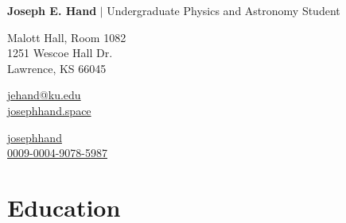 \documentclass[12pt]{article}
\newcommand{\contactinfo}[3]{
    #1\hspace{6pt}\href{#2}{#3}\hspace{6pt}
}
\begin{document}
\setlength{\parindent}{0pt}

\thispagestyle{plain}

{\LARGE\textbf{Joseph E. Hand} $\vert$} Undergraduate Physics and Astronomy Student\bigskip

\begin{minipage}{\dimexpr\textwidth/3}
  Malott Hall, Room 1082\\
  1251 Wescoe Hall Dr.\\
  Lawrence, KS 66045
\end{minipage}
\begin{minipage}{\dimexpr\textwidth/3}
  \contactinfo{\faEnvelope}{mailto:jehand@ku.edu}{jehand@ku.edu}\\
  \contactinfo{\faGlobe}{https://josephhand.space}{josephhand.space}\\
\end{minipage}
\begin{minipage}{\dimexpr\textwidth/3}
  \contactinfo{\faGithub}{https://github.com/josephhand}{josephhand}\\
  \contactinfo{\aiOrcid}{https://orcid.org/0009-0004-9078-5987}{0009-0004-9078-5987}\\
\end{minipage}
\medskip



%

\newenvironment{education}[4]{
  \medskip
  \begin{minipage}[t]{0.75in}
    #3
  \end{minipage}
  \begin{minipage}[t]{\dimexpr\textwidth-0.75in}
    \textbf{#1}, \textit{#2}

    #4
    
    \smallskip
}{
  \end{minipage}
}

\vspace{-3ex}
\section*{Education}\vspace{-1ex}\vspace{-1ex}
\end{document}
